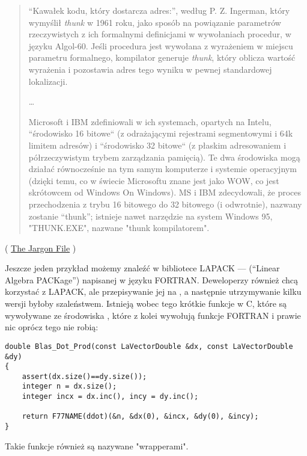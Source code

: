 \begin{framed}
\begin{quotation}
“Kawałek kodu, który dostarcza adres:”, według P. Z. Ingerman,
który wymyślił \emph{thunk} w 1961 roku, jako sposób na powiązanie parametrów rzeczywistych z ich formalnymi
definicjami w wywołaniach procedur, w języku Algol-60. Jeśli procedura jest wywołana z wyrażeniem
w miejscu parametru formalnego, kompilator generuje \emph{thunk}, który oblicza
wartość wyrażenia i pozostawia adres tego wyniku w pewnej standardowej lokalizacji.

\dots

Microsoft i IBM zdefiniowali w ich systemach, opartych na Intelu, “środowisko 16 bitowe“
(z odrażającymi rejestrami segmentowymi i 64k limitem adresów) i “środowisko 32 bitowe“
(z płaskim adresowaniem i półrzeczywistym trybem zarządzania pamięcią). Te dwa środowiska mogą
działać równocześnie na tym samym komputerze i systemie operacyjnym (dzięki temu, co w świecie Microsoftu znane jest jako WOW, co jest skrótowcem od Windows On Windows). MS i IBM zdecydowali, że proces przechodzenia
z trybu 16 bitowego do 32 bitowego (i odwrotnie), nazwany zostanie “thunk”; istnieje nawet
narzędzie na system Windows 95, "THUNK.EXE", nazwane "thunk kompilatorem".
\end{quotation}
\end{framed}
( \href{http://go.yurichev.com/17362}{The Jargon File} )

Jeszcze jeden przykład możemy znaleźć w bibliotece LAPACK --- (``Linear Algebra PACKage'') napisanej w języku FORTRAN.
Deweloperzy \CCpp również chcą korzystać z LAPACK, ale przepisywanie jej na \CCpp, a następnie utrzymywanie kilku wersji byłoby szaleństwem.
Istnieją wobec tego krótkie funkcje w C, które są wywoływane ze środowiska \CCpp{}, które z kolei wywołują funkcje FORTRAN i prawie nic oprócz tego nie robią:

\begin{lstlisting}[style=customc]
double Blas_Dot_Prod(const LaVectorDouble &dx, const LaVectorDouble &dy)
{
    assert(dx.size()==dy.size());
    integer n = dx.size();
    integer incx = dx.inc(), incy = dy.inc();

    return F77NAME(ddot)(&n, &dx(0), &incx, &dy(0), &incy);
}
\end{lstlisting}

Takie funkcje również są nazywane "wrapperami".


